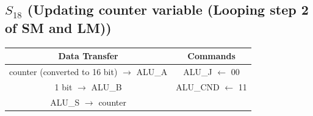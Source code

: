 \documentclass[]{report}
\begin{document}
            \subsection*{$S_{18}$ (Updating counter variable (Looping step 2 of SM and LM))} %
            \begin{center}
                \begin{tabular}{|c|c|}
                    \hline
                    Data Transfer & Commands \\
                    \hline
                    counter (converted to 16 bit) $\to$ ALU\_A & ALU\_J $\leftarrow$ 00\\
                    1 bit $\to$ ALU\_B & ALU\_CND $\leftarrow$ 11\\
                    ALU\_S $\to$ counter & \\
                    \hline
                \end{tabular}
            \end{center} 

\end{document}
